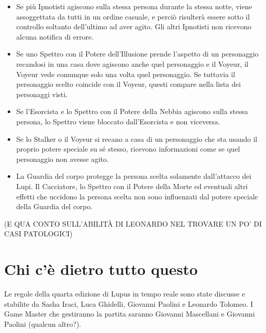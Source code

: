 \documentclass[a4paper,10pt]{article}
\begin{document}
\begin{itemize}
 \item Se più Ipnotisti agiscono sulla stessa persona durante la stessa notte, viene assoggettata da tutti in un ordine casuale, e perciò risulterà essere sotto il controllo soltanto dell'ultimo ad aver agito. Gli altri Ipnotisti non ricevono alcuna notifica di errore.
 
 \item Se uno Spettro con il Potere dell'Illusione prende l'aspetto di un personaggio recandosi in una casa dove agiscono anche quel personaggio e il Voyeur, il Voyeur vede comunque solo una volta quel personaggio. Se tuttavia il personaggio scelto coincide con il Voyeur, questi compare nella lista dei personaggi visti.

 \item Se l'Esorcista e lo Spettro con il Potere della Nebbia agiscono sulla stessa persona, lo Spettro viene bloccato dall'Esorcista e non viceversa.
 
 \item Se lo Stalker o il Voyeur si recano a casa di un personaggio che sta usando il proprio potere speciale su sé stesso, ricevono informazioni come se quel personaggio non avesse agito.
 
 \item La Guardia del corpo protegge la persona scelta solamente dall'attacco dei Lupi. Il Cacciatore, lo Spettro con il Potere della Morte ed eventuali altri effetti che uccidono la persona scelta non sono influenzati dal potere speciale della Guardia del corpo.
 
\end{itemize}


(E QUA CONTO SULL'ABILITÀ DI LEONARDO NEL TROVARE UN PO' DI CASI PATOLOGICI)



\section{Chi c'è dietro tutto questo}

Le regole della quarta edizione di Lupus in tempo reale sono state discusse e stabilite da Sasha Iraci, Luca Ghidelli, Giovanni Paolini e Leonardo Tolomeo.
I Game Master che gestiranno la partita saranno Giovanni Mascellani e Giovanni Paolini (qualcun altro?).
\end{document}
